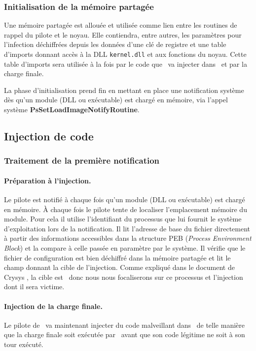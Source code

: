 \subsubsection{Initialisation de la mémoire partagée}
Une mémoire partagée est allouée et utilisée comme lien entre les routines de rappel du pilote et le noyau.
Elle contiendra, entre autres, les paramètres pour l'infection déchiffrées depuis les données d'une clé de registre et une table d'imports donnant accès à la DLL \texttt{kernel.dll} et aux fonctions du noyau.
Cette table d'imports sera utilisée à la fois par le code que \duqu\ va injecter dans \services\ et par la charge finale.

La phase d'initialisation prend fin en mettant en place une notification système dès qu'un module (DLL ou exécutable) est chargé en mémoire, via l'appel système \textbf{PsSetLoadImageNotifyRoutine}.

\FloatBarrier
\subsection{Injection de code}
\subsubsection{Traitement de la première notification}
\paragraph{Préparation à l'injection.}
Le pilote est notifié à chaque fois qu'un module (DLL ou exécutable) est chargé en mémoire.
À chaque fois le pilote tente de localiser l'emplacement mémoire du module.
Pour cela il utilise l'identifiant du processus que lui fournit le système d'exploitation lors de la notification.
Il lit l'adresse de base du fichier directement à partir des informations accessibles dans la structure PEB (\emph{Process Environment Block}) et la compare à celle passée en paramètre par le système.
Il vérifie que le fichier de configuration est bien déchiffré dans la mémoire partagée et lit le champ donnant la cible de l'injection.
Comme expliqué dans le document de Crysys \cite{CrysysDuquStuxnet}, la cible est \services\ donc nous nous focaliserons sur ce processus et l'injection dont il sera victime.

\paragraph{Injection de la charge finale.}
Le pilote de \duqu\ va maintenant injecter du code malveillant dans \services\ de telle manière que la charge finale soit exécutée par \services\ avant que son code légitime ne soit à son tour exécuté.


